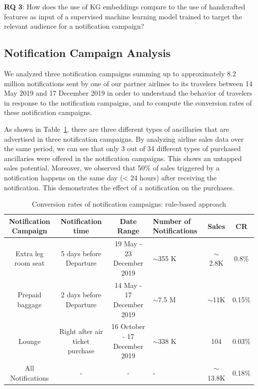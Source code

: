 \documentclass[11pt,dvipdfm]{article}
\begin{document}
\textbf{RQ 3}: How does the use of KG embeddings compare to the use of handcrafted features as input of a supervised machine learning model trained to target the relevant audience for a notification campaign? 

\subsection{Notification Campaign Analysis}
\label{sec:campaign-analysis}
We analyzed three notification campaigns summing up to approximately 8.2 million notifications sent by one of our partner airlines to its travelers between 14 May 2019 and 17 December 2019 in order to understand the behavior of travelers in response to the notification campaigns, and to compute the conversion rates of these notification campaigns.

As shown in Table~\ref{tab:Notif_Conversion}, there are three different types of ancillaries that are advertised in three notification campaigns. By analyzing airline sales data over the same period, we can see that only 3 out of 34 different types of purchased ancillaries were offered in the notification campaigns. This shows an untapped sales potential. Moreover, we observed that 50\% of sales triggered by a notification happens on the same day (< 24 hours) after receiving the notification. This demonstrates the effect of a notification on the purchases.

\begin{table}[htbp]
  \centering
  \caption{Conversion rates of notification campaigns: rule-based approach}
  \label{tab:Notif_Conversion}
  \footnotesize
  \begin{tabular}{|c|c|c|p{1.5cm}|c|c|}
    \hline
    Notification Campaign & Notification time & Date Range & Number of Notifications & Sales & CR\\
    \hline
    Extra leg room seat & 5 days before Departure & 19 May - 23 December 2019 & $\sim$355 K & $\sim$2.8K & 0.8\% \\
    \hline
    Prepaid baggage & 2 days before Departure & 14 May - 17 December 2019 & $\sim$7.5 M & $\sim$11K & 0.15\% \\
    \hline
    Lounge & Right after air ticket purchase & 16 October - 17 December 2019 & $\sim$338 K & 104 & 0.03\% \\
    \hline
    All Notifications & - & - & - & $\sim$13.8K & 0.18\% \\
  \hline
\end{tabular}
\end{table}
\end{document}
